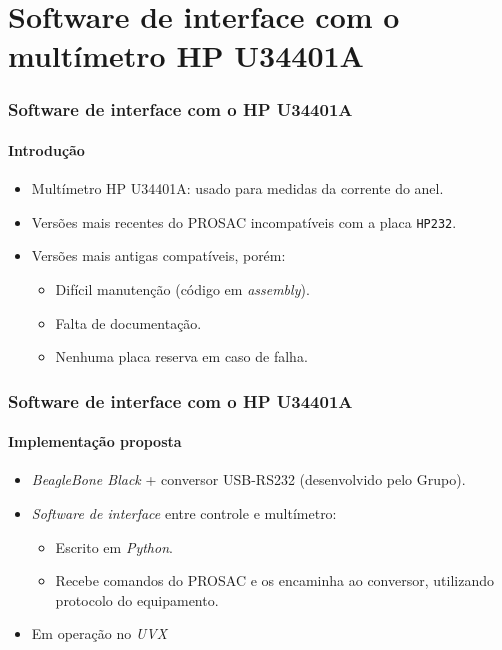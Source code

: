 \section{Software de interface com o multímetro HP U34401A}

\begin{frame}
\frametitle{Software de interface com o HP U34401A}
\framesubtitle{Introdução}

\begin{itemize}
  \item Multímetro HP U34401A: usado para medidas da corrente do anel.
  \vspace{12pt}
  \item Versões mais recentes do PROSAC incompatíveis com a placa
  \texttt{HP232}.
  \vspace{12pt}
  \item Versões mais antigas compatíveis, porém:
	\begin{itemize}
	\item Difícil manutenção (código em \textit{assembly}).
	\item Falta de documentação.
	\item Nenhuma placa reserva em caso de falha.
	\end{itemize}	    
\end{itemize}

\end{frame}

\begin{frame}
\frametitle{Software de interface com o HP U34401A}
\framesubtitle{Implementação proposta}

\begin{itemize}
  \item \textit{BeagleBone Black} + conversor USB-RS232 (desenvolvido pelo
  Grupo).
  \vspace{12pt}
  \item \textit{Software de interface} entre controle e multímetro:
  	\begin{itemize}
	\item Escrito em \textit{Python}.
	\item Recebe comandos do PROSAC e os encaminha ao conversor, utilizando
	protocolo do equipamento.
	\end{itemize}
	\vspace{12pt}
	\item Em operação no \textit{UVX}		    
\end{itemize}

\end{frame}